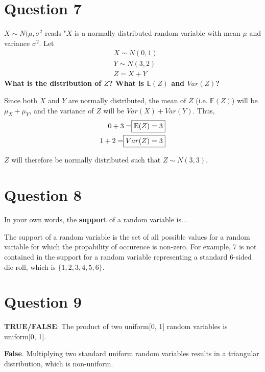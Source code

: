 \documentclass[titlepage, 12pt, leqno]{article}
\begin{document}
\section{Question 7}
\begin{ex}
    $X \sim N(\mu, \sigma^{2}$ reads "$X$ is a normally distributed random
    variable with mean $\mu$ and variance $\sigma^{2}$. Let
    \begin{align*}
        & X \sim N(0,1) \\
        & Y \sim N(3,2) \\
        & Z = X + Y
    \end{align*}
    \textbf{What is the distribution of $Z$? What is $ \mathbb{E}(Z)$ and
    $Var(Z)$?}
\end{ex}

Since both $X$ and $Y$ are normally distributed, the mean of $Z$ 
(i.e. $ \mathbb{E}(Z)$) will be $\mu_X + \mu_Y$, and the variance of $Z$ will be
$Var(X) + Var(Y)$. Thus,
\begin{align*}
    0+3 = \Aboxed{\mathbb{E}(Z) &= 3} \\
    1+2 = \Aboxed{Var(Z) &= 3}
\end{align*}

$Z$ will therefore be $\boxed{ \text{normally distributed}}$ such that
$Z \sim N(3,3)$.

\section{Question 8}
\begin{ex}
    In your own words, the \textbf{support} of a random variable is...
\end{ex}

The support of a random variable is the set of all possible values for a random
variable for which the propability of occurence is non-zero. For example, 7 is
not contained in the support for a random variable representing a standard 
6-sided die roll, which is $\{1,2,3,4,5,6\}$.

\pagebreak
\section{Question 9}
\begin{ex}
    \textbf{TRUE/FALSE}: The product of two uniform[0, 1] random variables is
    uniform[0, 1].
\end{ex}

\textbf{False}. Multiplying two standard uniform random variables results in a 
triangular distribution, which is non-uniform.
\end{document}
